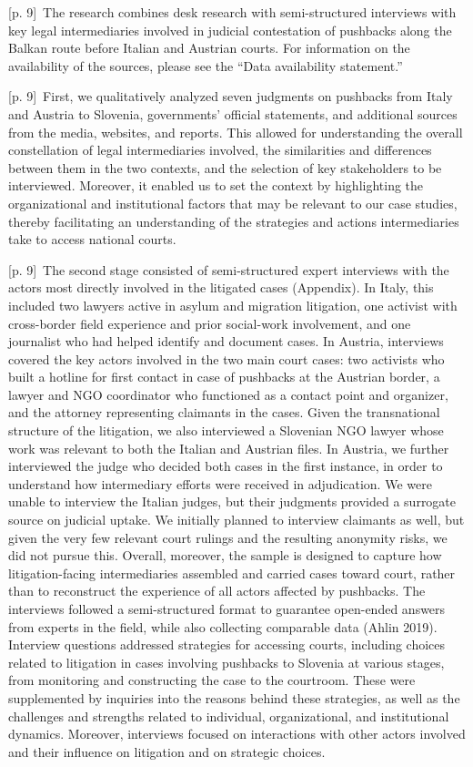 \documentclass[10pt,a4paper]{article}
\begin{document}
{\scriptsize\color{gray} [p. 9]}\ The research combines desk research with semi-structured interviews with key legal intermediaries involved in judicial contestation of pushbacks along the Balkan route before Italian and Austrian courts. For information on the availability of the sources, please see the “Data availability statement.”\par
{\scriptsize\color{gray} [p. 9]}\ First, we qualitatively analyzed seven judgments on pushbacks from Italy and Austria to Slovenia, governments’ official statements, and additional sources from the media, websites, and reports. This allowed for understanding the overall constellation of legal intermediaries involved, the similarities and differences between them in the two contexts, and the selection of key stakeholders to be interviewed. Moreover, it enabled us to set the context by highlighting the organizational and institutional factors that may be relevant to our case studies, thereby facilitating an understanding of the strategies and actions intermediaries take to access national courts.\par
{\scriptsize\color{gray} [p. 9]}\ The second stage consisted of semi-structured expert interviews with the actors most directly involved in the litigated cases (Appendix). In Italy, this included two lawyers active in asylum and migration litigation, one activist with cross-border field experience and prior social-work involvement, and one journalist who had helped identify and document cases. In Austria, interviews covered the key actors involved in the two main court cases: two activists who built a hotline for first contact in case of pushbacks at the Austrian border, a lawyer and NGO coordinator who functioned as a contact point and organizer, and the attorney representing claimants in the cases. Given the transnational structure of the litigation, we also interviewed a Slovenian NGO lawyer whose work was relevant to both the Italian and Austrian files. In Austria, we further interviewed the judge who decided both cases in the first instance, in order to understand how intermediary efforts were received in adjudication. We were unable to interview the Italian judges, but their judgments provided a surrogate source on judicial uptake. We initially planned to interview claimants as well, but given the very few relevant court rulings and the resulting anonymity risks, we did not pursue this. Overall, moreover, the sample is designed to capture how litigation-facing intermediaries assembled and carried cases toward court, rather than to reconstruct the experience of all actors affected by pushbacks. The interviews followed a semi-structured format to guarantee open-ended answers from experts in the field, while also collecting comparable data (Ahlin 2019). Interview questions addressed strategies for accessing courts, including choices related to litigation in cases involving pushbacks to Slovenia at various stages, from monitoring and constructing the case to the courtroom. These were supplemented by inquiries into the reasons behind these strategies, as well as the challenges and strengths related to individual, organizational, and institutional dynamics. Moreover, interviews focused on interactions with other actors involved and their influence on litigation and on strategic choices.\par
\end{document}
